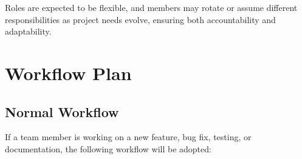 \documentclass{article}
\begin{document}
\noindent
Roles are expected to be flexible, and members may rotate or assume different responsibilities as project needs evolve, ensuring both accountability and adaptability.

\section{Workflow Plan}


\subsection{Normal Workflow}
If a team member is working on a new feature, bug fix, testing, or documentation,
the following workflow will be adopted:
\end{document}

